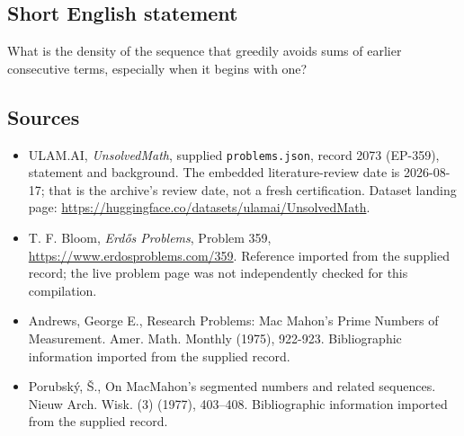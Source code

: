 \documentclass[11pt,a4paper]{article}
\begin{document}
\subsection{Short English statement}

What is the density of the sequence that greedily avoids sums of earlier consecutive terms, especially when it begins with one?

\subsection{Sources}

{\small

\begin{itemize}

\item[\hypertarget{source:2073:1}{S1}] ULAM.AI, \emph{UnsolvedMath}, supplied \texttt{problems.json}, record 2073 (EP-359), statement and background. The embedded literature-review date is 2026-08-17; that is the archive’s review date, not a fresh certification. Dataset landing page: \url{https://huggingface.co/datasets/ulamai/UnsolvedMath}.

\item[\hypertarget{source:2073:2}{S2}] T. F. Bloom, \emph{Erdős Problems}, Problem 359, \url{https://www.erdosproblems.com/359}. Reference imported from the supplied record; the live problem page was not independently checked for this compilation.

\item[\hypertarget{source:2073:3}{S3}] Andrews, George E., Research Problems: Mac Mahon's Prime Numbers of Measurement. Amer. Math. Monthly (1975), 922-923. Bibliographic information imported from the supplied record.

\item[\hypertarget{source:2073:4}{S4}] Porubsk\'y, \v S., On {M}ac{M}ahon's segmented numbers and related sequences. Nieuw Arch. Wisk. (3) (1977), 403--408. Bibliographic information imported from the supplied record.

\end{itemize}

}

\label{end:2073}
\end{document}
